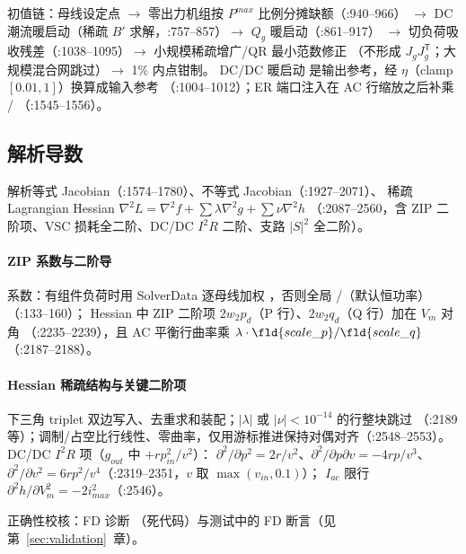 初值链：母线设定点 $\to$ 零出力机组按 $P^{max}$ 比例分摊缺额（:940--966）
$\to$ DC 潮流暖启动（稀疏 $B'$ 求解，:757--857）$\to$ $Q_g$ 暖启动（:861--917）
$\to$ 切负荷吸收残差（:1038--1095）$\to$ 小规模稀疏增广/QR 最小范数修正
（不形成 $J_gJ_g^{\mathsf T}$；大规模混合网跳过）$\to$ 1\% 内点钳制。
DC/DC 暖启动  是输出参考，经 $\eta$（clamp $[0.01,1]$）换算成输入参考
（:1004--1012）；ER 端口注入在 AC 行缩放之后补乘 /
（:1545--1556）。

\subsection{解析导数}
解析等式 Jacobian（:1574--1780）、不等式 Jacobian（:1927--2071）、
稀疏 Lagrangian Hessian $\nabla^2L=\nabla^2f+\sum\lambda\nabla^2g+\sum\nu\nabla^2h$
（:2087--2560，含 ZIP 二阶项、VSC 损耗全二阶、DC/DC $I^2R$ 二阶、支路 $|S|^2$ 全二阶）。

\paragraph{ZIP 系数与二阶导}
系数：有组件负荷时用 SolverData 逐母线加权 ，否则全局
/（默认恒功率）（:133--160）；
Hessian 中 ZIP 二阶项 $2w_2p_d$（P 行）、$2w_2q_d$（Q 行）加在 $V_m$ 对角
（:2235--2239），且 AC 平衡行曲率乘 $\lambda\cdot\fld{scale\_p}/\fld{scale\_q}$
（:2187--2188）。

\paragraph{Hessian 稀疏结构与关键二阶项}
下三角 triplet 双边写入、去重求和装配；$|\lambda|$ 或 $|\nu|<10^{-14}$ 的行整块跳过
（:2189 等）；调制/占空比行线性、零曲率，仅用游标推进保持对偶对齐（:2548--2553）。
DC/DC $I^2R$ 项（$g_{out}$ 中 $+rp_{in}^2/v^2$）：
$\partial^2/\partial p^2=2r/v^2$、$\partial^2/\partial p\partial v=-4rp/v^3$、
$\partial^2/\partial v^2=6rp^2/v^4$（:2319--2351，$v$ 取 $\max(v_{in},0.1)$）；
$I_{ac}$ 限行 $\partial^2h/\partial V_m^2=-2i_{max}^2$（:2546）。

正确性校核：FD 诊断 （死代码）与测试中的
FD 断言（见第~\ref{sec:validation}~章）。

